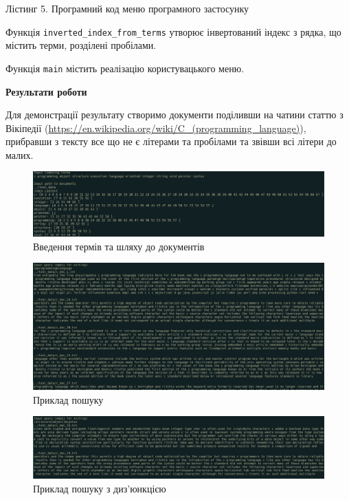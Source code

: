 \documentclass{../../templates/information_retrieval_lab}
\begin{document}
Лістинг 5. Програмний код меню програмного застосунку



Функція \texttt{inverted\_index\_from\_terms} утворює інвертований індекс з рядка, що містить терми, розділені пробілами.

Функція \texttt{main} містить реалізацію користувацького меню.

\centerline{\textbf{Результати роботи}}

Для демонстрації результату створимо документи поділивши на чатини статтю з Вікіпедії (\url{https://en.wikipedia.org/wiki/C_(programming_language)}), прибравши з тексту все що не є літерами та пробілами та звівши всі літери до малих.

\begin{figure}[H]
    \centering
    \includegraphics[width=\textwidth]{img/screen0.png}
    \caption{Введення термів та шляху до документів}
\end{figure}

\begin{figure}[H]
    \centering
    \includegraphics[width=\textwidth]{img/screen1.png}
    \caption{Приклад пошуку}
\end{figure}

\begin{figure}[H]
    \centering
    \includegraphics[width=\textwidth]{img/screen2.png}
    \caption{Приклад пошуку з диз'юнкцією}
\end{figure}
\end{document}
